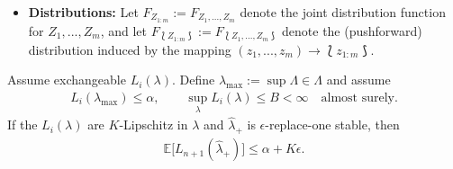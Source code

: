 \begin{itemize}
    \item \textbf{Distributions:} Let $F_{Z_{1:m}}:=F_{Z_1, ..., Z_m}$ denote the joint distribution function for $Z_1, ..., Z_m$, and let $F_{\lbag Z_{1:m}\rbag}:=F_{\lbag Z_1, ..., Z_m\rbag}$ denote the (pushforward) distribution induced by the mapping $(z_1, ..., z_m)\rightarrow \lbag z_{1:m} \rbag$. 
\end{itemize}



    
    

\begin{theorem}
    Assume exchangeable $L_i(\lambda)$. Define  $\lambda_{\max}:=\sup\Lambda\in \Lambda$ and assume 
    \begin{align*}
        L_i(\lambda_{\max})\leq \alpha, \qquad \sup_{\lambda}L_i(\lambda)\leq B < \infty \quad \text{almost surely}.
    \end{align*}
    If the $L_i(\lambda)$ are $K$-Lipschitz in $\lambda$ and $\hat\lambda_+$ is $\epsilon$-replace-one stable, then
    \begin{align*}
        \mathbb{E}\big[L_{n+1}(\hat\lambda_+)\big] \leq \alpha + K\epsilon.
    \end{align*}
\end{theorem}

